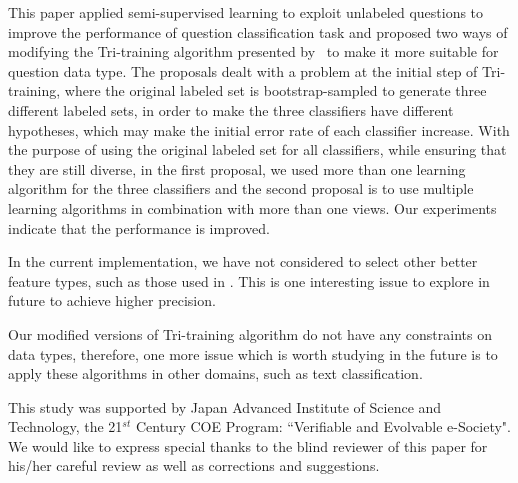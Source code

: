 \documentclass[english]{jnlp_1.4}
\begin{document}
This paper applied semi-supervised learning to exploit unlabeled
questions to improve the performance of question classification
task and proposed two ways of modifying the Tri-training algorithm
presented by~\cite{Zhi05} to make it more suitable for question
data type. The proposals dealt with a problem at the initial step
of Tri-training, where the original labeled set is
bootstrap-sampled to generate three different labeled sets, in
order to make the three classifiers have different hypotheses,
which may make the initial error rate of each classifier increase.
With the purpose of using the original labeled set for all
classifiers, while ensuring that they are still diverse, in the
first proposal, we used more than one learning algorithm for the
three classifiers and the second proposal is to use multiple
learning algorithms in combination with more than one views. Our
experiments indicate that the performance is improved.

In the current implementation, we have not considered to select
other better feature types, such as those used in \cite{Li02}.
This is one interesting issue to explore in future to achieve
higher precision.

Our modified versions of Tri-training algorithm do not have any
constraints on data types, therefore, one more issue which is
worth studying in the future is to apply these algorithms in other
domains, such as text classification.



\acknowledgment

This study was supported by Japan Advanced Institute of Science
and Technology, the 21$^{st}$ Century  COE Program: ``Verifiable
and Evolvable e-Society". 
We would like to express special thanks to the blind reviewer of this paper for his/her careful review as well as corrections and suggestions.
\end{document}
